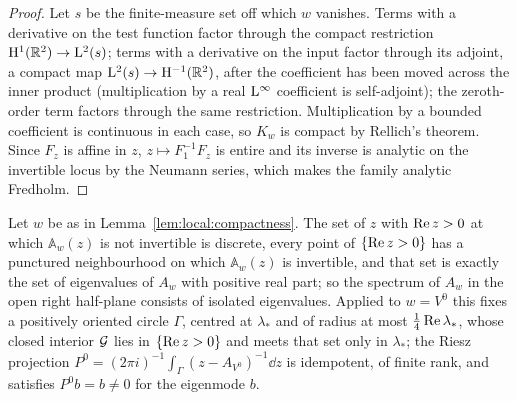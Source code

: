 \begin{proof}
  \leanok
  Let $s$ be the finite-measure set off which $w$ vanishes.  Terms with a derivative on
  the test function factor through the compact restriction $\mathrm{H}^1(\mathbb{R}^2)\to\mathrm{L}^2(s)$;
  terms with a derivative on the input factor through its adjoint, a compact map
  $\mathrm{L}^2(s)\to\mathrm{H}^{-1}(\mathbb{R}^2)$, after the coefficient has been moved across the
  inner product (multiplication by a real $\mathrm{L}^\infty$ coefficient is self-adjoint); the
  zeroth-order term factors through the same restriction.  Multiplication by a bounded
  coefficient is continuous in each case, so $K_w$ is compact by Rellich's theorem.  Since
  $F_z$ is affine in $z$, $z\mapsto F_1^{-1}F_z$ is entire and its inverse is analytic on
  the invertible locus by the Neumann series, which makes the family analytic Fredholm.
\end{proof}

\begin{lemma}
  \label{lem:local:isolation}
  \leanok
  Let $w$ be as in Lemma~\ref{lem:local:compactness}.  The set of $z$ with $\operatorname{Re} z>0$ at
  which $\mathbb A_w(z)$ is not invertible is discrete, every point of $\{\operatorname{Re} z>0\}$ has a
  punctured neighbourhood on which $\mathbb A_w(z)$ is invertible, and that set is exactly the
  set of eigenvalues of $A_w$ with positive real part; so the spectrum of $A_w$ in the open
  right half-plane consists of isolated eigenvalues.  Applied to $w=V^0$ this fixes a
  positively oriented circle $\Gamma$, centred at $\lambda_*$ and of radius at most
  $\tfrac14\operatorname{Re}\lambda_*$, whose closed interior $\mathcal{G}$ lies in $\{\operatorname{Re} z>0\}$ and meets that
  set only in $\lambda_*$; the Riesz projection
  $P^0=(2\pi i)^{-1}\int_\Gamma(z-A_{V^0})^{-1}\dd z$ is idempotent, of finite rank, and
  satisfies $P^0b=b\neq0$ for the eigenmode $b$.
\end{lemma}

